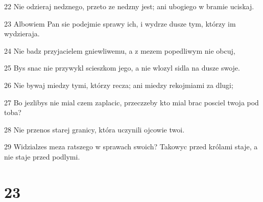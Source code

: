 \par 22 Nie odzieraj nedznego, przeto ze nedzny jest; ani ubogiego w bramie uciskaj.
\par 23 Albowiem Pan sie podejmie sprawy ich, i wydrze dusze tym, którzy im wydzieraja.
\par 24 Nie badz przyjacielem gniewliwemu, a z mezem popedliwym nie obcuj,
\par 25 Bys snac nie przywykl scieszkom jego, a nie wlozyl sidla na dusze swoje.
\par 26 Nie bywaj miedzy tymi, którzy recza; ani miedzy rekojmiami za dlugi;
\par 27 Bo jezlibys nie mial czem zaplacic, przeczzeby kto mial brac posciel twoja pod toba?
\par 28 Nie przenos starej granicy, która uczynili ojcowie twoi.
\par 29 Widzialzes meza ratszego w sprawach swoich? Takowyc przed królami staje, a nie staje przed podlymi.

\chapter{23}


